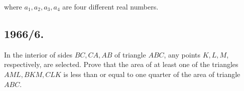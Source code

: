 \documentclass{article}
\begin{document}
where $a_1, a_2, a_3, a_4$ are four different real numbers.

\subsection*{1966/6.}
In the interior of sides $BC, CA, AB$ of triangle $ABC$, any points $K, L, M$, respectively, are selected. Prove that the area of at least one of the triangles $AML, BKM, CLK$ is less than or equal to one quarter of the area of triangle $ABC$.
\end{document}

